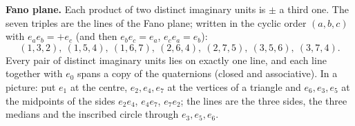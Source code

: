 \documentclass[10pt,a4paper]{article}
\begin{document}
\textbf{Fano plane.} Each product of two distinct imaginary units is $\pm$ a third one. The seven triples are the lines of the Fano plane; written in the cyclic order $(a,b,c)$ with $e_ae_b=+e_c$ (and then $e_be_c=e_a$, $e_ce_a=e_b$):
\begin{equation*}
(1,3,2),\ (1,5,4),\ (1,6,7),\ (2,6,4),\ (2,7,5),\ (3,5,6),\ (3,7,4).
\end{equation*}
Every pair of distinct imaginary units lies on exactly one line, and each line together with $e_0$ spans a copy of the quaternions (closed and associative). In a picture: put $e_1$ at the centre, $e_2,e_4,e_7$ at the vertices of a triangle and $e_6,e_3,e_5$ at the midpoints of the sides $e_2e_4$, $e_4e_7$, $e_7e_2$; the lines are the three sides, the three medians and the inscribed circle through $e_3,e_5,e_6$.
\end{document}
